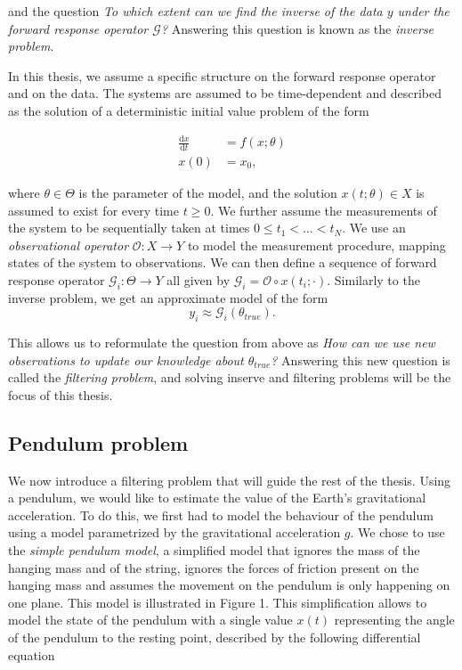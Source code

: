 and the question \textit{To which extent can we find the \textit{inverse} of the data $y$ under the forward response operator $\mathcal{G}$?} Answering this question is known as the \textit{inverse problem}.

In this thesis, we assume a specific structure on the forward response operator and on the data. The systems are assumed to be time-dependent and described as the solution of a deterministic initial value problem of the form

\begin{equation}
  \begin{aligned}
    \frac{\text{d}x}{\text{d}t} &= f(x; \theta)\\
    x(0) &= x_0,
  \end{aligned}
\end{equation}  

where $\theta \in \Theta$ is the parameter of the model, and the solution $x(t; \theta) \in X$ is assumed to exist for every time $t \geq 0$. We further assume the measurements of the system to be sequentially taken at times  $0 \leq t_1 < \ldots < t_N$. We use an \textit{observational operator} $\mathcal{O} : X \rightarrow Y$ to model the measurement procedure, mapping states of the system to observations. We can then define a sequence of forward response operator $\mathcal{G}_i : \Theta \rightarrow Y$ all given by $\mathcal{G}_i = \mathcal{O} \circ x(t_i; \cdot)$. Similarly to the inverse problem, we get an approximate model of the form
\begin{equation}
  y_i \approx \mathcal{G}_i(\theta_{true}).
\end{equation}

This allows us to reformulate the question from above as \textit{How can we use new observations to update our knowledge about $\theta_{true}$?} Answering this new question is called the \textit{filtering problem}, and solving inserve and filtering problems will be the focus of this thesis.

\subsection{Pendulum problem}

We now introduce a filtering problem that will guide the rest of the thesis. Using a pendulum, we would like to estimate the value of the Earth's gravitational acceleration. To do this, we first had to model the behaviour of the pendulum using a model parametrized by the gravitational acceleration $g$. We chose to use the \textit{simple pendulum model}, a simplified model that ignores the mass of the hanging mass and of the string, ignores the forces of friction present on the hanging mass and assumes the movement on the pendulum is only happening on one plane. This model is illustrated in Figure 1. This simplification allows to model the state of the pendulum with a single value $x(t)$ representing the angle of the pendulum to the resting point, described by the following differential equation

